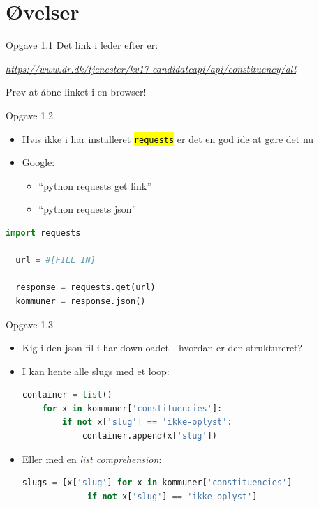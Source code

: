 \documentclass[10pt]{beamer}
\let\OldTexttt\texttt
\renewcommand{\texttt}[1]{\OldTexttt{\hl{#1}}}%
\begin{document}
\section{Øvelser}


\begin{frame}[fragile]{Opgave 1.1}
  Det link i leder efter er:
  \begin{centering}\textit{
  \href{'https://www.dr.dk/tjenester/kv17-candidateapi/api/constituency/all'}{https://www.dr.dk/tjenester/kv17-candidateapi/api/constituency/all}}
  \end{centering}
  Prøv at åbne linket i en browser!
\end{frame}

\begin{frame}[fragile]{Opgave 1.2}
  \begin{itemize}
    \item Hvis ikke i har installeret \texttt{requests} er det en god ide at gøre det nu
    \item Google:
    \begin{itemize}
      \item ``python requests get link''
      \item ``python requests json''
    \end{itemize}
  \end{itemize}

  \begin{lstlisting}[language=python]
  import requests

  url = #[FILL IN]

  response = requests.get(url)
  kommuner = response.json()
  \end{lstlisting}
\end{frame}

\begin{frame}[fragile]{Opgave 1.3}
  \begin{itemize}
    \item Kig i den json fil i har downloadet - hvordan er den struktureret?

    \item I kan hente alle slugs med et loop:
    \begin{lstlisting}[language=python]
    container = list()
    for x in kommuner['constituencies']:
        if not x['slug'] == 'ikke-oplyst':
            container.append(x['slug'])
    \end{lstlisting}
    \item Eller med en \textit{list comprehension}:
    \begin{lstlisting}[language=python]
    slugs = [x['slug'] for x in kommuner['constituencies']
             if not x['slug'] == 'ikke-oplyst']
    \end{lstlisting}
  \end{itemize}
\end{frame}
\end{document}
